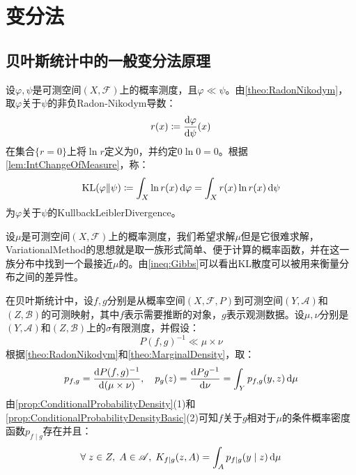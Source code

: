 \section{变分法}

\subsection{贝叶斯统计中的一般变分法原理}
\begin{definition}
	设$\varphi,\psi$是可测空间$(X,\mathscr{F})$上的概率测度，且$\varphi\ll\psi$。由\cref{theo:RadonNikodym}，取$\varphi$关于$\psi$的非负Radon-Nikodym导数：
	\begin{equation*}
		r(x)\coloneq\dfrac{\mathop{}\!\mathrm{d}\varphi}{\mathop{}\!\mathrm{d}\psi}(x)
	\end{equation*}
	在集合$\{r=0\}$上将$\ln r$定义为$0$，并约定$0\ln0=0$。根据\cref{lem:IntChangeOfMeasure}，称：
	\begin{equation*}
		\operatorname{KL}(\varphi\|\psi)\coloneq\int_{X}\ln r(x)\mathop{}\!\mathrm{d}\varphi=\int_{X}r(x)\ln r(x)\mathop{}\!\mathrm{d}\psi
	\end{equation*}
	为$\varphi$关于$\psi$的\gls{KullbackLeiblerDivergence}。
\end{definition}
\begin{note}
	设$\mu$是可测空间$(X,\mathscr{F})$上的概率测度，我们希望求解$\mu$但是它很难求解，\gls{VariationalMethod}的思想就是取一族形式简单、便于计算的概率函数，并在这一族分布中找到一个最接近$\mu$的。由\cref{ineq:Gibbs}可以看出KL散度可以被用来衡量分布之间的差异性。
\end{note}
在贝叶斯统计中，设$f,g$分别是从概率空间$(X,\mathscr{F},P)$到可测空间$(Y,\mathscr{A})$和$(Z,\mathscr{B})$的可测映射，其中$f$表示需要推断的对象，$g$表示观测数据。设$\mu,\nu$分别是$(Y,\mathscr{A})$和$(Z,\mathscr{B})$上的$\sigma$有限测度，并假设：
\begin{equation*}
	P(f,g)^{-1}\ll\mu\times\nu
\end{equation*}
根据\cref{theo:RadonNikodym}和\cref{theo:MarginalDensity}，取：
\begin{equation*}
	p_{f,g}=\dfrac{\mathop{}\!\mathrm{d} P(f,g)^{-1}}{\mathop{}\!\mathrm{d}(\mu\times\nu)},\quad p_g(z)=\dfrac{\mathop{}\!\mathrm{d} Pg^{-1}}{\mathop{}\!\mathrm{d}\nu}=\int_{Y}p_{f,g}(y,z)\mathop{}\!\mathrm{d}\mu
\end{equation*}
由\cref{prop:ConditionalProbabilityDensity}(1)和\cref{prop:ConditionalProbabilityDensityBasic}(2)可知$f$关于$g$相对于$\mu$的条件概率密度函数$p_{f\mid g}$存在并且：
\begin{equation*}
	\forall\;z\in Z,\;A\in\mathscr{A},\;K_{f\mid g}(z,A)=\int_Ap_{f\mid g}(y\mid z)\mathop{}\!\mathrm{d}\mu
\end{equation*}
